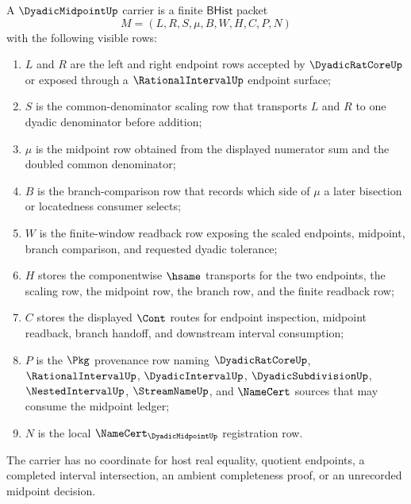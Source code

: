 \begin{definition}
\label{def:dyadic-midpoint-carrier}
A $\DyadicMidpointUp$ carrier is a finite $\mathsf{BHist}$ packet
$$
M=(L,R,S,\mu,B,W,H,C,P,N)
$$
with the following visible rows:
\begin{enumerate}
\item $L$ and $R$ are the left and right endpoint rows accepted by $\DyadicRatCoreUp$ or exposed through a $\RationalIntervalUp$ endpoint surface;
\item $S$ is the common-denominator scaling row that transports $L$ and $R$ to one dyadic denominator before addition;
\item $\mu$ is the midpoint row obtained from the displayed numerator sum and the doubled common denominator;
\item $B$ is the branch-comparison row that records which side of $\mu$ a later bisection or locatedness consumer selects;
\item $W$ is the finite-window readback row exposing the scaled endpoints, midpoint, branch comparison, and requested dyadic tolerance;
\item $H$ stores the componentwise $\hsame$ transports for the two endpoints, the scaling row, the midpoint row, the branch row, and the finite readback row;
\item $C$ stores the displayed $\Cont$ routes for endpoint inspection, midpoint readback, branch handoff, and downstream interval consumption;
\item $P$ is the $\Pkg$ provenance row naming $\DyadicRatCoreUp$, $\RationalIntervalUp$, $\DyadicIntervalUp$, $\DyadicSubdivisionUp$, $\NestedIntervalUp$, $\StreamNameUp$, and $\NameCert$ sources that may consume the midpoint ledger;
\item $N$ is the local $\NameCert_{\DyadicMidpointUp}$ registration row.
\end{enumerate}
The carrier has no coordinate for host real equality, quotient endpoints, a completed interval intersection, an ambient completeness proof, or an unrecorded midpoint decision.
\end{definition}


